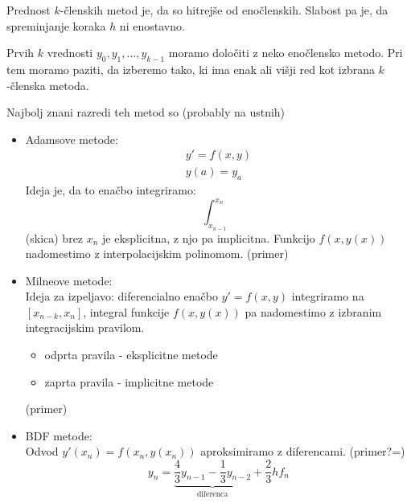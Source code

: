 \documentclass[a4paper,12pt]{article}
\theoremstyle{definition}
\theoremstyle{remark}
\begin{document}
Prednost $k$-členskih metod je, da so hitrejše od enočlenskih. Slabost pa je, da spreminjanje koraka $h$ ni enostavno.

Prvih $k$ vrednosti $y_0, y_1, \dots, y_{k-1}$ moramo določiti z neko enočlensko metodo. Pri tem moramo paziti, da izberemo tako, ki ima enak ali višji red kot izbrana $k$-členska metoda.

Najbolj znani razredi teh metod so (probably na ustnih)
\begin{itemize}
    \item Adamsove metode:
    \begin{gather*}
        y' = f(x, y) \\
        y(a) = y_a
    \end{gather*}
    Ideja je, da to enačbo integriramo:
    \begin{equation*}
        \int_{x_{n-1}}^{x_n} 
    \end{equation*}
    (skica)
    brez $x_n$ je eksplicitna, z njo pa implicitna. Funkcijo $f(x, y(x))$ nadomestimo z interpolacijskim polinomom.
    (primer)
    \item Milneove metode: \\
    Ideja za izpeljavo: diferencialno enačbo $y' = f(x, y)$ integriramo na $[x_{n-k}, x_n]$, integral funkcije $f(x, y(x))$ pa nadomestimo
    z izbranim integracijskim pravilom.
    \begin{itemize}
        \item odprta pravila - eksplicitne metode
        \item zaprta pravila - implicitne metode
    \end{itemize}
    (primer)
    \item BDF metode: \\
    Odvod $y'(x_n) = f(x_n, y(x_n))$ aproksimiramo z diferencami.
    (primer?=)
    \begin{equation*}
        y_n = \underbrace{\frac{4}{3} y_{n-1} - \frac{1}{3} y_{n-2}}_{\text{diferenca}} + \frac{2}{3} h f_n
    \end{equation*}
\end{itemize}
\end{document}
